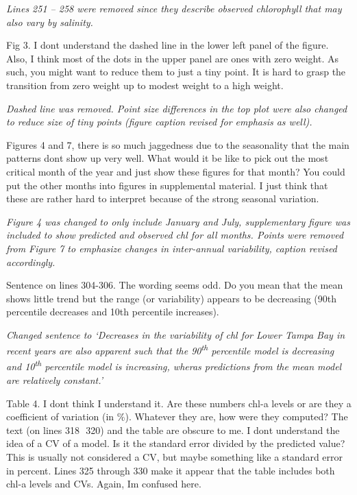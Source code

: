 \documentclass[letterpaper,12pt,oneside]{article}\usepackage[]{graphicx}\usepackage[]{color}
\newcommand{\nine}{90\textsuperscript{th} percentile }
\newcommand{\ten}{10\textsuperscript{th} percentile }
\begin{document}
\textit{Lines 251 -- 258 were removed since they describe observed chlorophyll that may also vary by salinity.}

Fig 3.  I dont understand the dashed line in the lower left panel of the figure.  Also, I think most of the dots in the upper panel are ones with zero weight.  As such, you might want to reduce them to just a tiny point.  It is hard to grasp the transition from zero weight up to modest weight to a high weight. 

\textit{Dashed line was removed.  Point size differences in the top plot were also changed to reduce size of tiny points (figure caption revised for emphasis as well).}

Figures 4 and 7, there is so much jaggedness due to the seasonality that the main patterns dont show up very well.  What would it be like to pick out the most critical month of the year and just show these figures for that month? You could put the other months into figures in supplemental material.  I just think that these are rather hard to interpret because of the strong seasonal variation.

\textit{Figure 4 was changed to only include January and July, supplementary figure was included to show predicted and observed \ac{chl} for all months.  Points were removed from Figure 7 to emphasize changes in inter-annual variability, caption revised accordingly.}

Sentence on lines 304-306.  The wording seems odd.  Do you mean that the mean shows little trend but the range (or variability) appears to be decreasing (90th percentile decreases and 10th percentile increases).

\textit{Changed sentence to `Decreases in the variability of \ac{chl} for Lower Tampa Bay in recent years are also apparent such that the \nine model is decreasing and \ten model is increasing, wheras predictions from the mean model are relatively constant.'}

Table 4.  I dont think I understand it.  Are these numbers chl-a levels or are they a coefficient of variation (in \%).  Whatever they are, how were they computed?  The text (on lines 318  320) and the table are obscure to me.   I dont understand the idea of a CV of a model.  Is it the standard error divided by the predicted value?  This is usually not considered a CV, but maybe something like a standard error in percent.  Lines 325 through 330 make it appear that the table includes both chl-a levels and CVs.  Again, Im confused here.
\end{document}
